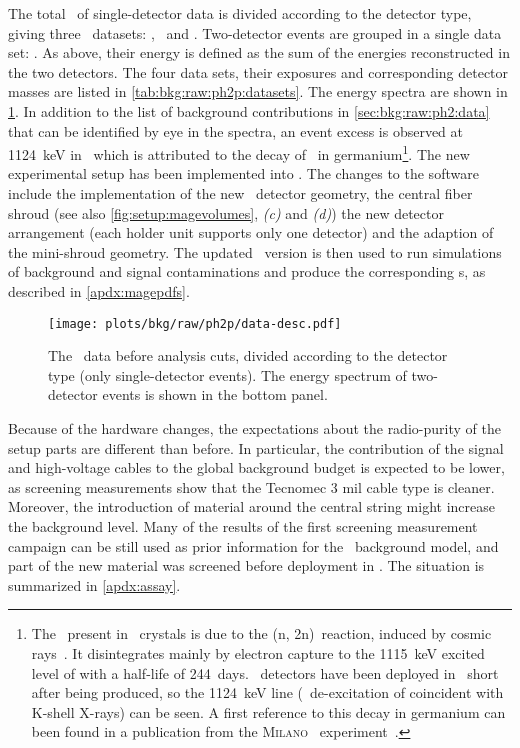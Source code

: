 The total \gexpophasetwopbkg\ of single-detector data is divided according to the detector
type, giving three \Mone\ datasets: \enrBEGeIIp, \enrSCoaxIIp\ and \enrICoaxIIp.
Two-detector events are grouped in a single data set: \enrGeIIp. As above, their energy is
defined as the sum of the energies reconstructed in the two detectors. The four data sets,
their exposures and corresponding detector masses are listed in
\cref{tab:bkg:raw:ph2p:datasets}. The energy spectra are shown in
\cref{fig:bkg:raw:ph2p:data-desc}. In addition to the list of background contributions in
\cref{sec:bkg:raw:ph2:data} that can be identified by eye in the spectra, an event excess
is observed at 1124~keV in \enrICoaxIIp\ which is attributed to the decay of \Zn\ in
germanium\footnote{%
  The \Zn\ present in \icoax\ crystals is due to the (n, \a{}2n)\Zn\ reaction,
  induced by cosmic rays~\cite{Cebrian2010, Horiguchi1983}. It disintegrates mainly by
  electron capture to the 1115~keV excited level of  with a half-life of
  244~days. \icoax\ detectors have been deployed in \gerda\ short after being produced, so
  the 1124~keV line (\g\ de-excitation of  coincident with K-shell X-rays) can
  be seen. A first reference to this decay in germanium can been found in a publication
  from the \textsc{Milano} \onbb\ experiment~\cite{Bellotti1986}.
}.
\newpar
The new experimental setup has been implemented into \mage. The changes to the software
include the implementation of the new \icoax\ detector geometry, the central fiber shroud
(see also \cref{fig:setup:magevolumes}, \emph{(c)} and \emph{(d)}) the new detector
arrangement (each holder unit supports only one detector) and the adaption of the
mini-shroud geometry. The updated \mage\ version is then used to run simulations of
background and signal contaminations and produce the corresponding \pdf{}s, as described in
\cref{apdx:magepdfs}.

\begin{figure}
  \centering
  \texttt{[image: plots/bkg/raw/ph2p/data-desc.pdf]}
  \caption{%
    The \phasetwop\ data before analysis cuts, divided according to the detector type
    (only single-detector events). The energy spectrum of two-detector events is shown in
    the bottom panel.
  }\label{fig:bkg:raw:ph2p:data-desc}
\end{figure}

Because of the hardware changes, the expectations about the radio-purity of
the setup parts are different than before. In particular, the contribution of the signal
and high-voltage cables to the global background budget is expected to be lower, as
screening measurements show that the Tecnomec 3 mil cable type is cleaner. Moreover, the
introduction of material around the central string might increase the background level.
Many of the results of the first screening measurement campaign can be still used as prior
information for the \phasetwop\ background model, and part of the new material was
screened before deployment in \gerda. The situation is summarized in \cref{apdx:assay}.

